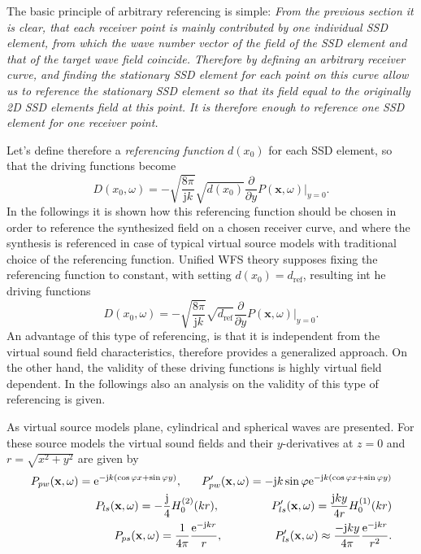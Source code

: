 \documentclass[12pt,a4paper]{article}
\newcommand{\te}{\mathrm{e}}
\newcommand{\ti}{\mathrm{j}}
\newcommand{\sinfi}{\sin\varphi}
\newcommand{\cosfi}{\cos\varphi}
\newcommand{\dref}{d_{\mathrm{ref}}}
\newcommand{\vx}{\mathbf{x}}
\begin{document}
The basic principle of arbitrary referencing is simple:
\emph{From the previous section it is clear, that each receiver point is mainly contributed by one individual SSD element, from which the wave number vector of the field of the SSD element and that of the target wave field coincide.
Therefore by defining an arbitrary receiver curve, and finding the stationary SSD element for each point on this curve allow us to reference the stationary SSD element so that its field equal to the originally 2D SSD elements field at this point. It is therefore enough to reference one SSD element for one receiver point.}
 
Let's define therefore a \emph{referencing function} $d(x_0)$ for each SSD element, so that the driving functions become
\begin{equation}
D(x_0,\omega) = 
- \sqrt{\frac{8\pi}{\ti k}} \sqrt{d(x_0)} \frac{\partial}{\partial y} \left. P(\vx,\omega) \right|_{y = 0}.
\end{equation}
In the followings it is shown how this referencing function should be chosen in order to reference the synthesized field on a chosen receiver curve, and where the synthesis is referenced in case of typical virtual source models with traditional choice of the referencing function.
Unified WFS theory supposes fixing the referencing function to constant, with setting $d(x_0) = \dref$, resulting int he driving functions
\begin{equation}
D(x_0,\omega) = 
- \sqrt{\frac{8\pi}{\ti k}}\sqrt{\dref} \frac{\partial}{\partial y} \left. P(\vx,\omega) \right|_{y = 0}.
\end{equation}
An advantage of this type of referencing, is that it is independent from the virtual sound field characteristics, therefore provides a generalized approach. On the other hand, the validity of these driving functions is highly virtual field dependent. In the followings also an analysis on the validity of this type of referencing is given.

As virtual source models plane, cylindrical and spherical waves are presented.
For these source models the virtual sound fields and their $y$-derivatives at $z = 0$ and $r = \sqrt{x^2 + y^2}$ are given by
\begin{eqnarray}
P_{pw}(\vx,\omega) = \te^{-\ti k ( \cosfi x + \sinfi y ) }, \hspace{6mm}
P'_{pw}(\vx,\omega) = -\ti k \sinfi \te^{-\ti k ( \cosfi x + \sinfi y ) }\\
%
P_{ls}(\vx,\omega) = -\frac{\ti}{4} H_0^{(2)}( k r), \hspace{16mm}
P'_{ls}(\vx,\omega) = \frac{\ti k y}{4 r} H_0^{(1)}( k r)\\
%
P_{ps}(\vx,\omega) = \frac{1}{4\pi} \frac{\te^{-\ti k r }}{r}, \hspace{16mm}
P'_{ls}(\vx,\omega) \approx \frac{-\ti k y}{4\pi} \frac{\te^{-\ti k r }}{r^2}.
\label{Eq:Virt_source_models}
\end{eqnarray}
\end{document}
